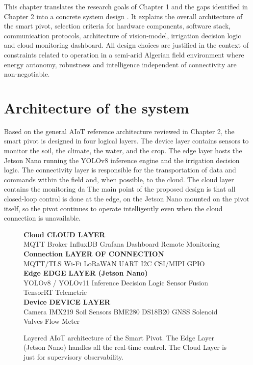 \documentclass[12pt,a4paper]{report}
\begin{document}
This chapter translates the research goals of Chapter 1 and the gaps identified in Chapter 2 into a concrete system design . It explains the overall architecture of the smart pivot, selection criteria for hardware components, software stack, communication protocols, architecture of vision-model, irrigation decision logic and cloud monitoring dashboard. All design choices are justified in the context of constraints related to operation in a semi-arid Algerian field environment where energy autonomy, robustness and intelligence independent of connectivity are non-negotiable.

\section{Architecture of the system}

Based on the general AIoT reference architecture reviewed in Chapter 2, the smart pivot is designed in four logical layers. The device layer contains sensors to monitor the soil, the climate, the water, and the crop. The edge layer hosts the Jetson Nano running the YOLOv8 inference engine and the irrigation decision logic. The connectivity layer is responsible for the transportation of data and commands within the field and, when possible, to the cloud. The cloud layer contains the monitoring da The main point of the proposed design is that all closed-loop control is done at the edge, on the Jetson Nano mounted on the pivot itself, so the pivot continues to operate intelligently even when the cloud connection is unavailable.

\begin{figure}[H]
\centering
\begin{tcolorbox}[width=0.95\textwidth, colback=white, colframe=black!45, arc=1mm]
\textbf{Cloud CLOUD LAYER}\\
MQTT Broker \textperiodcentered{} InfluxDB \textperiodcentered{} Grafana Dashboard \textperiodcentered{} Remote Monitoring\\[4pt]
\textbf{Connection LAYER OF CONNECTION}\\
MQTT/TLS Wi-Fi LoRaWAN UART I2C CSI/MIPI GPIO\\[4pt]
\textbf{Edge EDGE LAYER (Jetson Nano)}\\
YOLOv8 / YOLOv11 Inference \textperiodcentered{} Decision Logic \textperiodcentered{} Sensor Fusion \textperiodcentered{} TensorRT \textperiodcentered{} Telemetrie\\[4pt]
\textbf{Device DEVICE LAYER}\\
Camera IMX219 Soil Sensors BME280 DS18B20 GNSS Solenoid Valves Flow Meter\\[4pt]
\end{tcolorbox}
\caption{Layered AIoT architecture of the Smart Pivot. The Edge Layer (Jetson Nano) handles all the real-time control. The Cloud Layer is just for supervisory observability.}
\end{figure}
\end{document}
